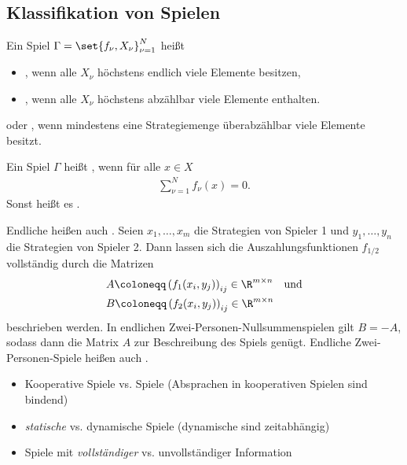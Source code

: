 \subsection{Klassifikation von Spielen}
\begin{definition*}
  Ein Spiel $\Gamma=\set{f_{\nu}, X_{\nu}}_{\nu = 1}^{N}$ heißt
  \begin{itemize}
  \item {}, wenn alle $X_{\nu}$ höchstens endlich viele Elemente besitzen, 
  \item {}, wenn alle $X_{\nu}$ höchstens abzählbar viele Elemente enthalten. 
  \end{itemize}
\item {} oder , wenn mindestens eine Strategiemenge überabzählbar viele Elemente besitzt. 
\end{definition*}
\begin{definition*}
  Ein Spiel $\Gamma$ heißt , wenn für alle $x \in X$
  \begin{align*}
    \sum_{\nu = 1}^{N} f_{\nu}(x) = 0.
  \end{align*}
Sonst heißt es . 
\end{definition*}
 Endliche  heißen auch . Seien $x_{1}, \dots, x_{m}$ die Strategien von Spieler 1 und $y_{1}, \dots, y_{n}$ die Strategien von Spieler 2. Dann lassen sich die Auszahlungsfunktionen $f_{1/2}$ vollständig durch die Matrizen
 \begin{align*}
&   A \coloneqq \left(f_{1}(x_{i},y_{j}) \right)_{ij} \in \R^{m \times n} \quad \text{und}\\
&   B \coloneqq \left(f_{2}(x_{i},y_{j}) \right)_{ij} \in \R^{m \times n}
 \end{align*}
beschrieben werden. In endlichen Zwei-Personen-Nullsummenspielen gilt $B = -A$, sodass dann die Matrix $A$ zur Beschreibung des Spiels genügt. Endliche Zwei-Personen-Spiele heißen auch .
\begin{itemize}
\item Kooperative Spiele vs.  Spiele (Absprachen in kooperativen Spielen sind bindend)
\item \emph{statische} vs. dynamische Spiele (dynamische sind zeitabhängig)
\item Spiele mit \emph{vollständiger} vs. unvollständiger Information
\end{itemize}
